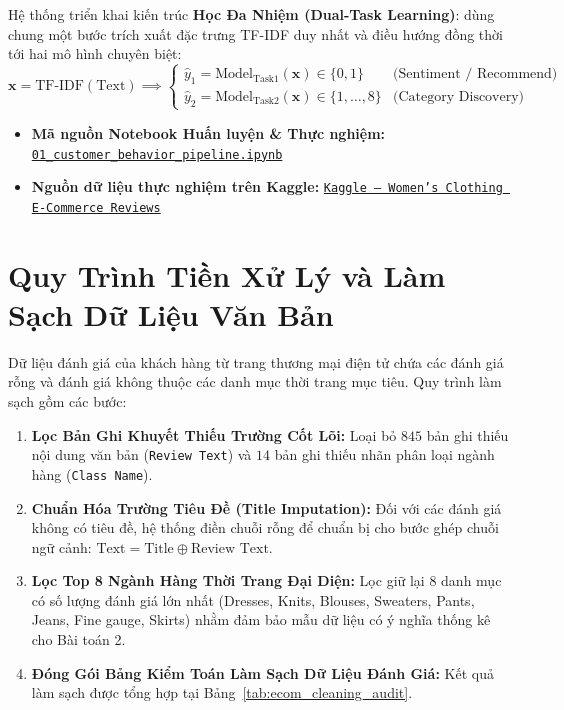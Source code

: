 \documentclass[12pt,a4paper]{report}
\begin{document}
Hệ thống triển khai kiến trúc \textbf{Học Đa Nhiệm (Dual-Task Learning)}: dùng chung một bước trích xuất đặc trưng TF-IDF duy nhất và điều hướng đồng thời tới hai mô hình chuyên biệt:
\begin{equation}
\mathbf{x} = \text{TF-IDF}(\text{Text}) \implies \begin{cases} \hat{y}_1 = \text{Model}_{\text{Task1}}(\mathbf{x}) \in \{0, 1\} & \text{(Sentiment / Recommend)} \\ \hat{y}_2 = \text{Model}_{\text{Task2}}(\mathbf{x}) \in \{1, \dots, 8\} & \text{(Category Discovery)} \end{cases}
\end{equation}

\begin{itemize}[leftmargin=1.5em, itemsep=2pt]
    \item \textbf{Mã nguồn Notebook Huấn luyện \& Thực nghiệm:}\\ \href{https://github.com/phamtu2x5/INTELLIGENT-SYSTEM-DEVELOPMENT/blob/main/src/Assigment%2002/customer_behavior/notebook/01_customer_behavior_pipeline.ipynb}{\texttt{01\_customer\_behavior\_pipeline.ipynb}}
    \item \textbf{Nguồn dữ liệu thực nghiệm trên Kaggle:} \href{https://www.kaggle.com/datasets/nicapotato/womens-ecommerce-clothing-reviews}{\texttt{Kaggle -- Women's Clothing E-Commerce Reviews}}
\end{itemize}

\section{Quy Trình Tiền Xử Lý và Làm Sạch Dữ Liệu Văn Bản}
Dữ liệu đánh giá của khách hàng từ trang thương mại điện tử chứa các đánh giá rỗng và đánh giá không thuộc các danh mục thời trang mục tiêu. Quy trình làm sạch gồm các bước:

\begin{enumerate}[leftmargin=2em]
    \item \textbf{Lọc Bản Ghi Khuyết Thiếu Trường Cốt Lõi:} Loại bỏ $845$ bản ghi thiếu nội dung văn bản (\texttt{Review Text}) và $14$ bản ghi thiếu nhãn phân loại ngành hàng (\texttt{Class Name}).
    \item \textbf{Chuẩn Hóa Trường Tiêu Đề (Title Imputation):} Đối với các đánh giá không có tiêu đề, hệ thống điền chuỗi rỗng để chuẩn bị cho bước ghép chuỗi ngữ cảnh: $\text{Text} = \text{Title} \oplus \text{Review Text}$.
    \item \textbf{Lọc Top 8 Ngành Hàng Thời Trang Đại Diện:} Lọc giữ lại 8 danh mục có số lượng đánh giá lớn nhất (Dresses, Knits, Blouses, Sweaters, Pants, Jeans, Fine gauge, Skirts) nhằm đảm bảo mẫu dữ liệu có ý nghĩa thống kê cho Bài toán 2.
    \item \textbf{Đóng Gói Bảng Kiểm Toán Làm Sạch Dữ Liệu Đánh Giá:} Kết quả làm sạch được tổng hợp tại Bảng~\ref{tab:ecom_cleaning_audit}.
\end{enumerate}
\end{document}
